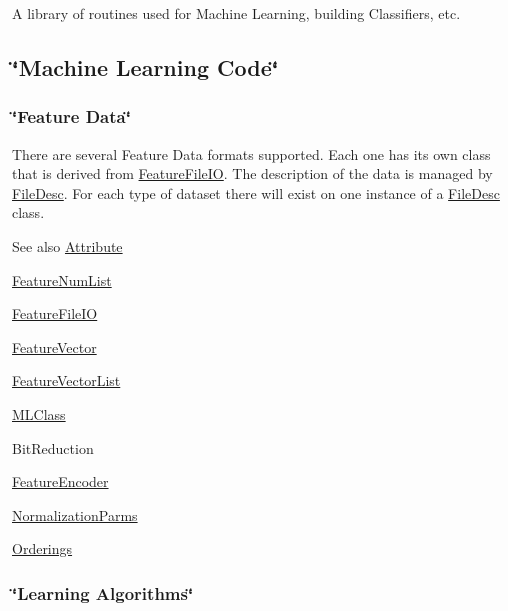 A library of routines used for Machine Learning, building Classifiers, etc.\hypertarget{namespace_k_k_m_l_l_MachineLearninig}{}\subsection{\char`\"{}\+Machine Learning Code\char`\"{}}\label{namespace_k_k_m_l_l_MachineLearninig}
\hypertarget{namespace_k_k_m_l_l_FeatureData}{}\subsubsection{\char`\"{}\+Feature Data\char`\"{}}\label{namespace_k_k_m_l_l_FeatureData}
There are several Feature Data formats supported. Each one has its own class that is derived from \textquotesingle{}\hyperlink{class_k_k_m_l_l_1_1_feature_file_i_o}{Feature\+File\+IO}\textquotesingle{}. The description of the data is managed by \textquotesingle{}\hyperlink{class_k_k_m_l_l_1_1_file_desc}{File\+Desc}\textquotesingle{}. For each type of dataset there will exist on one instance of a \hyperlink{class_k_k_m_l_l_1_1_file_desc}{File\+Desc} class. \begin{DoxySeeAlso}{See also}
\hyperlink{class_k_k_m_l_l_1_1_attribute}{Attribute} 

\hyperlink{class_k_k_m_l_l_1_1_feature_num_list}{Feature\+Num\+List} 

\hyperlink{class_k_k_m_l_l_1_1_feature_file_i_o}{Feature\+File\+IO} 

\hyperlink{class_k_k_m_l_l_1_1_feature_vector}{Feature\+Vector} 

\hyperlink{class_k_k_m_l_l_1_1_feature_vector_list}{Feature\+Vector\+List} 

\hyperlink{class_k_k_m_l_l_1_1_m_l_class}{M\+L\+Class} 

Bit\+Reduction 

\hyperlink{class_k_k_m_l_l_1_1_feature_encoder}{Feature\+Encoder} 

\hyperlink{class_k_k_m_l_l_1_1_normalization_parms}{Normalization\+Parms} 

\hyperlink{class_k_k_m_l_l_1_1_orderings}{Orderings}
\end{DoxySeeAlso}
\hypertarget{namespace_k_k_m_l_l_LearningAlgorithms}{}\subsubsection{\char`\"{}\+Learning Algorithms\char`\"{}}\label{namespace_k_k_m_l_l_LearningAlgorithms}
